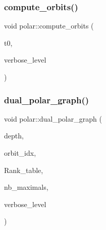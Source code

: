 \mbox{\label{classpolar_ac4c3c4f95d14c74ff4a3ec3f3479a1da}} 
\subsubsection{\texorpdfstring{compute\+\_\+orbits()}{compute\_orbits()}}
{\footnotesize\ttfamily void polar\+::compute\+\_\+orbits (\begin{DoxyParamCaption}\item[{\mbox{\hyperlink{galois_8h_a09fddde158a3a20bd2dcadb609de11dc}{I\+NT}}}]{t0,  }\item[{\mbox{\hyperlink{galois_8h_a09fddde158a3a20bd2dcadb609de11dc}{I\+NT}}}]{verbose\+\_\+level }\end{DoxyParamCaption})}

\mbox{\label{classpolar_a6e5e2b0d9d3447cac72cb82ce3d2e9e5}} 
\subsubsection{\texorpdfstring{dual\+\_\+polar\+\_\+graph()}{dual\_polar\_graph()}}
{\footnotesize\ttfamily void polar\+::dual\+\_\+polar\+\_\+graph (\begin{DoxyParamCaption}\item[{\mbox{\hyperlink{galois_8h_a09fddde158a3a20bd2dcadb609de11dc}{I\+NT}}}]{depth,  }\item[{\mbox{\hyperlink{galois_8h_a09fddde158a3a20bd2dcadb609de11dc}{I\+NT}}}]{orbit\+\_\+idx,  }\item[{\mbox{\hyperlink{classlonginteger__object}{longinteger\+\_\+object}} $\ast$\&}]{Rank\+\_\+table,  }\item[{\mbox{\hyperlink{galois_8h_a09fddde158a3a20bd2dcadb609de11dc}{I\+NT}} \&}]{nb\+\_\+maximals,  }\item[{\mbox{\hyperlink{galois_8h_a09fddde158a3a20bd2dcadb609de11dc}{I\+NT}}}]{verbose\+\_\+level }\end{DoxyParamCaption})}

\mbox{\label{classpolar_a71a043abbfbafb684996d7ca7e14ac52}} 
